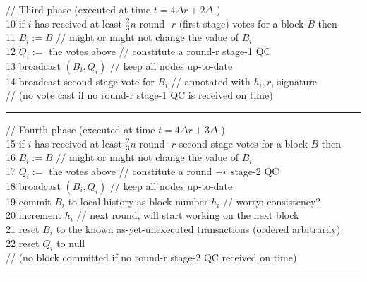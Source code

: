 {$/ /$ Third phase (executed at time $t=4 \Delta r+2 \Delta$ )\\
10\hspace{0.2cm} if $i$ has received at least $\frac{2}{3} n$ round- $r$ (first-stage) votes for a block $B$ then\\
11\hspace{0.2cm} $B_i:=B$
\quad $/ /$ might or might not change the value of $B_i$\\
12\hspace{0.2cm} $Q_i:=$ the votes above \quad\quad\quad\quad // constitute a round-r stage-1 QC\\
13\hspace{0.2cm} broadcast $\left(B_i, Q_i\right)$ \quad\quad\quad\quad // keep all nodes up-to-date\\
14\hspace{0.2cm} broadcast second-stage vote for $B_i$ \quad\quad\quad\quad // annotated with $h_i, r$, signature\\
// (no vote cast if no round-r stage-1 QC is received on time)\\
\hrule

$/ /$ Fourth phase (executed at time $t=4 \Delta r+3 \Delta$ )\\
15\hspace{0.2cm} if $i$ has received at least $\frac{2}{3} n$ round- $r$ second-stage votes for a block $B$ then\\
16\hspace{0.2cm} $B_i:=B$ \quad \quad\quad\quad $/ /$ might or might not change the value of $B_i$\\
17\hspace{0.2cm} $Q_i:=$ the votes above \quad \quad\quad\quad // constitute a round $-r$ stage-2 QC\\
18\hspace{0.2cm} broadcast $\left(B_i, Q_i\right)$ \quad\quad\quad\quad // keep all nodes up-to-date\\
19\hspace{0.2cm} commit $B_i$ to local history as block number $h_i$ \quad \quad\quad\quad // worry: consistency?\\
20\hspace{0.2cm} increment $h_i$ \quad \quad  \quad\quad// next round, will start working on the next block\\
21\hspace{0.2cm} reset $B_i$ to the known as-yet-unexecuted transactions (ordered arbitrarily)\\
22\hspace{0.2cm} reset $Q_i$ to null\\
// (no block committed if no round-r stage-2 QC received on time)\\
\hrule

}
